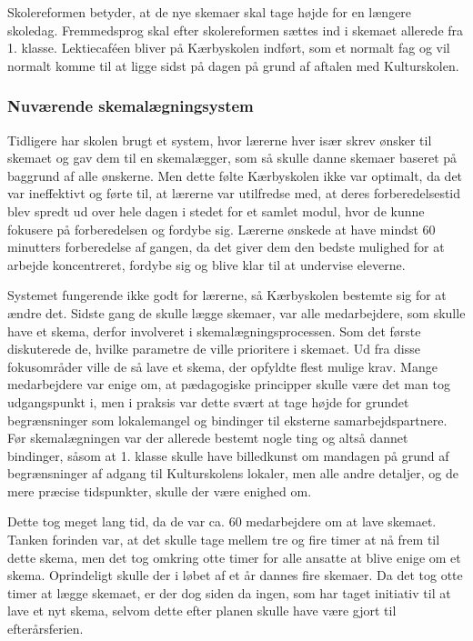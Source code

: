 Skolereformen betyder, at de nye skemaer skal tage højde for en længere skoledag. Fremmedsprog skal efter skolereformen sættes ind i skemaet allerede fra 1. klasse. Lektiecaf\'een bliver på Kærbyskolen indført, som et normalt fag og vil normalt komme til at ligge sidst på dagen på grund af aftalen med Kulturskolen\cite{kaerby_skolereform}.

\subsubsection*{Nuværende skemalægningsystem}
Tidligere har skolen brugt et system, hvor lærerne hver især skrev ønsker til skemaet og gav dem til en skemalægger, som så skulle danne skemaer baseret på baggrund af alle ønskerne. Men dette følte Kærbyskolen ikke var optimalt, da det var ineffektivt og førte til, at lærerne var utilfredse med, at deres forberedelsestid blev spredt ud over hele dagen i stedet for et samlet modul, hvor de kunne fokusere på forberedelsen og fordybe sig\cite{interview_Kaerby}. Lærerne ønskede at have mindst 60 minutters forberedelse af gangen, da det giver dem den bedste mulighed for at arbejde koncentreret, fordybe sig og blive klar til at undervise eleverne.

Systemet fungerende ikke godt for lærerne, så Kærbyskolen bestemte sig for at ændre det. Sidste gang de skulle lægge skemaer, var alle medarbejdere, som skulle have et skema, derfor involveret i skemalægningsprocessen. Som det første diskuterede de, hvilke parametre de ville prioritere i skemaet. Ud fra disse fokusområder ville de så lave et skema, der opfyldte flest mulige krav. Mange medarbejdere var enige om, at pædagogiske principper skulle være det man tog udgangspunkt i, men i praksis var dette svært at tage højde for grundet begrænsninger som lokalemangel og bindinger til eksterne samarbejdspartnere. Før skemalægningen var der allerede bestemt nogle ting og altså dannet bindinger, såsom at 1. klasse skulle have billedkunst om mandagen på grund af begrænsninger af adgang til Kulturskolens lokaler, men alle andre detaljer, og de mere præcise tidspunkter, skulle der være enighed om. 

Dette tog meget lang tid, da de var ca. 60 medarbejdere om at lave skemaet. Tanken forinden var, at det skulle tage mellem tre og fire timer at nå frem til dette skema, men det tog omkring otte timer for alle ansatte at blive enige om et skema. Oprindeligt skulle der i løbet af et år dannes fire skemaer. Da det tog otte timer at lægge skemaet, er der dog siden da ingen, som har taget initiativ til at lave et nyt skema, selvom dette efter planen skulle have være gjort til efterårsferien.


